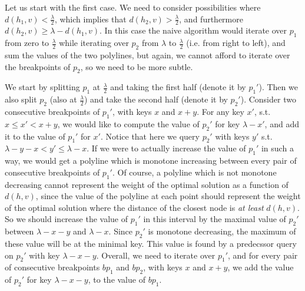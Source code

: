 \documentclass[11pt,a4paper]{article}
\theoremstyle{definition}
\theoremstyle{remark}
\begin{document}
\begin{enumerate}
Let us start with the first case. We need to consider possibilities where $d(h_1,v) < \frac{\lambda}{2}$, which implies that $d(h_2,v) > \frac{\lambda}{2}$, and furthermore $d(h_2,v) \geq \lambda - d(h_1,v)$. In this case the naive algorithm would iterate over $p_1$ from zero to $\frac{\lambda}{2}$ while iterating over $p_2$ from $\lambda$ to $\frac{\lambda}{2}$ (i.e. from right to left), and sum the values of the two polylines, but again, we cannot afford to iterate over the breakpoints of $p_2$, so we need to be more subtle.

We start by splitting $p_1$ at $\frac{\lambda}{2}$ and taking the first half (denote it by $p_1'$). Then we also split $p_2$ (also at $\frac{\lambda}{2}$) and take the second half (denote it by $p_2'$). Consider two consecutive breakpoints of $p_1'$, with keys $x$ and $x+y$. For any key $x'$, s.t. $x \leq x' < x+y$, we would like to compute the value of $p_2'$ for key $\lambda-x'$, and add it to the value of $p_1'$ for $x'$. Notice that here we query $p_2'$ with keys $y'$ s.t. $\lambda -y -x < y' \leq \lambda-x$. If we were to actually increase the value of $p_1'$ in such a way, we would get a polyline which is monotone increasing between every pair of consecutive breakpoints of $p_1'$. Of course, a polyline which is not monotone decreasing cannot represent the weight of the optimal solution as a function of $d(h,v)$, since the value of the polyline at each point should represent the weight of the optimal solution where the distance of the closest node is \emph{at least} $d(h,v)$. So we should increase the value of $p_1'$ in this interval by the maximal value of $p_2'$ between $\lambda -x -y$ and $\lambda-x$. Since $p_2'$ is monotone decreasing, the maximum of these value will be at the minimal key. This value is found by a predecssor query on $p_2'$ with key $\lambda-x-y$. Overall, we need to iterate over $p_1'$, and for every pair of consecutive breakpoints $bp_1$ and $bp_2$, with keys $x$ and $x+y$, we add the value of $p_2'$ for key $\lambda-x-y$, to the value of $bp_1$.


\end{enumerate}
\end{document}
